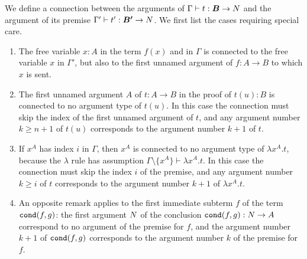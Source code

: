 %
%


We define a connection between the arguments of $\Gamma \vdash t:\vec{B} 
\rightarrow \N$ and the argument of its premise $\Gamma' \vdash t':\vec{B'} 
\rightarrow \N$. We first list the cases requiring special care.
\begin{enumerate}
\item
The free variable $x:A$ in the term $f(x)$ and in 
$\Gamma$ is connected to the free variable $x$ in $\Gamma'$, but also to the first 
unnamed argument of $f:A \rightarrow B$ to which $x$ is sent.
\item
The first unnamed argument $A$ of $t:A \rightarrow B$ in the proof of $t(u):B$ is connected to no argument type of $t(u)$.
In this case the connection must skip the index of the first unnamed argument of 
$t$, and any argument number $k \ge n+1$ of $t(u)$ corresponds to the argument 
number $k+1$ of $t$. 
\item
If $x^A$ has index $i$ in $\Gamma$, then $x^A$ is connected 
to no argument type of $\lambda x^A.t$, because the $\lambda$ rule
has assumption $\Gamma \setminus \{x^A\} \vdash \lambda x^A.t$.
In this case the connection must skip the index $i$ of the premise,
and any argument number $k \ge i $ of $t$ 
corresponds to the argument number $k+1$ of $ \lambda x^A.t$. 
\item
An opposite remark applies to the first immediate subterm $f$ of the
term ${\tt cond}(f,g)$:  the first argument ${N}$ of the conclusion 
${\tt cond}(f,g):{N} \rightarrow A$ correspond to no argument of the premise for $f$, 
and the argument number $k+1$ of ${\tt cond}(f,g)$ corresponds to the argument 
number $k$ of the premise for $f$. 
\end{enumerate}

